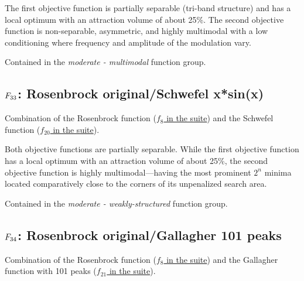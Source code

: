The first objective function is partially separable (tri-band structure)
and has a local optimum with an attraction volume of about 25\%.
The second objective function is non-separable, asymmetric, and
highly multimodal with a low conditioning where
frequency and amplitude of the modulation vary.

Contained in the \emph{moderate - multimodal} function group.



\subsection[\texorpdfstring{\protect\(F_{33}\protect\): Rosenbrock original/Schwefel x*sin(x)}{F33: Rosenbrock original/Schwefel x*sin(x)}]{\texorpdfstring{\protect\(F_{33}\protect\): Rosenbrock original/Schwefel x*sin(x)}{}}
\label{index:rosenbrock-original-schwefel-x-sin-x}\label{index:f33}
Combination of the Rosenbrock function (\href{https://coco.gforge.inria.fr/downloads/download16.00/bbobdocfunctions.pdf\#page=40}{\(f_8\) in the \bbob suite}) and the
Schwefel function (\href{https://coco.gforge.inria.fr/downloads/download16.00/bbobdocfunctions.pdf\#page=100}{\(f_{20}\) in the \bbob suite}).

Both objective functions are partially separable.
While the first objective function has a local optimum with an attraction
volume of about 25\%, the second objective function is highly
multimodal---having the most prominent \(2^n\) minima located
comparatively close to the corners of its unpenalized search area.

Contained in the \emph{moderate - weakly-structured} function group.



\subsection[\texorpdfstring{\protect\(F_{34}\protect\): Rosenbrock original/Gallagher 101 peaks}{F34: Rosenbrock original/Gallagher 101 peaks}]{\texorpdfstring{\protect\(F_{34}\protect\): Rosenbrock original/Gallagher 101 peaks}{}}
\label{index:f34}\label{index:rosenbrock-original-gallagher-101-peaks}
Combination of the Rosenbrock function (\href{https://coco.gforge.inria.fr/downloads/download16.00/bbobdocfunctions.pdf\#page=40}{\(f_8\) in the \bbob suite}) and
the Gallagher function with 101 peaks (\href{https://coco.gforge.inria.fr/downloads/download16.00/bbobdocfunctions.pdf\#page=105}{\(f_{21}\) in the \bbob suite}).

